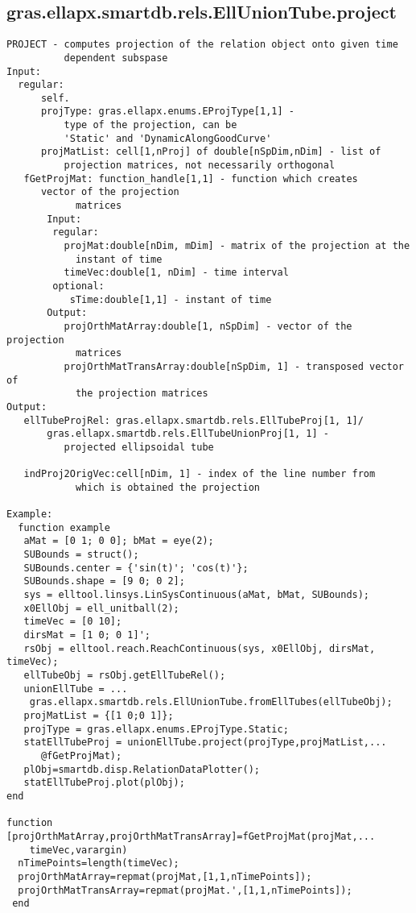 \subsection{\texorpdfstring{gras.ellapx.smartdb.rels.EllUnionTube.project}{project}}\label{method:gras.ellapx.smartdb.rels.EllUnionTube.project}
\begin{verbatim}
PROJECT - computes projection of the relation object onto given time
          dependent subspase
Input:
  regular:
      self.
      projType: gras.ellapx.enums.EProjType[1,1] -
          type of the projection, can be
          'Static' and 'DynamicAlongGoodCurve'
      projMatList: cell[1,nProj] of double[nSpDim,nDim] - list of
          projection matrices, not necessarily orthogonal
   fGetProjMat: function_handle[1,1] - function which creates
      vector of the projection
            matrices
       Input:
        regular:
          projMat:double[nDim, mDim] - matrix of the projection at the
            instant of time
          timeVec:double[1, nDim] - time interval
        optional:
           sTime:double[1,1] - instant of time
       Output:
          projOrthMatArray:double[1, nSpDim] - vector of the projection
            matrices
          projOrthMatTransArray:double[nSpDim, 1] - transposed vector of
            the projection matrices
Output:
   ellTubeProjRel: gras.ellapx.smartdb.rels.EllTubeProj[1, 1]/
       gras.ellapx.smartdb.rels.EllTubeUnionProj[1, 1] -
          projected ellipsoidal tube

   indProj2OrigVec:cell[nDim, 1] - index of the line number from
            which is obtained the projection

Example:
  function example
   aMat = [0 1; 0 0]; bMat = eye(2);
   SUBounds = struct();
   SUBounds.center = {'sin(t)'; 'cos(t)'};
   SUBounds.shape = [9 0; 0 2];
   sys = elltool.linsys.LinSysContinuous(aMat, bMat, SUBounds);
   x0EllObj = ell_unitball(2);
   timeVec = [0 10];
   dirsMat = [1 0; 0 1]';
   rsObj = elltool.reach.ReachContinuous(sys, x0EllObj, dirsMat, timeVec);
   ellTubeObj = rsObj.getEllTubeRel();
   unionEllTube = ...
    gras.ellapx.smartdb.rels.EllUnionTube.fromEllTubes(ellTubeObj);
   projMatList = {[1 0;0 1]};
   projType = gras.ellapx.enums.EProjType.Static;
   statEllTubeProj = unionEllTube.project(projType,projMatList,...
      @fGetProjMat);
   plObj=smartdb.disp.RelationDataPlotter();
   statEllTubeProj.plot(plObj);
end

function [projOrthMatArray,projOrthMatTransArray]=fGetProjMat(projMat,...
    timeVec,varargin)
  nTimePoints=length(timeVec);
  projOrthMatArray=repmat(projMat,[1,1,nTimePoints]);
  projOrthMatTransArray=repmat(projMat.',[1,1,nTimePoints]);
 end
\end{verbatim}
